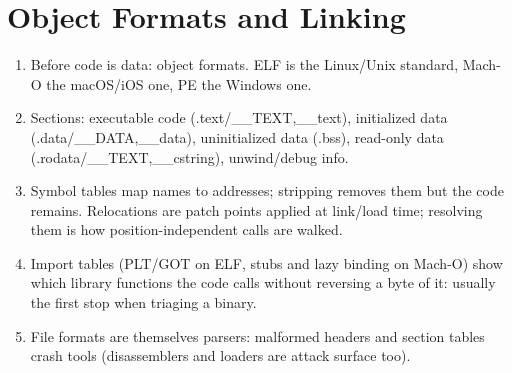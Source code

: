 \documentclass[12pt]{Training}
\begin{document}
\section*{Object Formats and Linking}
\begin{enumerate}
    \item Before code is data: object formats. ELF is the Linux/Unix standard, Mach-O the macOS/iOS one, PE the Windows one.
    \item Sections: executable code (.text/\_\_TEXT,\_\_text), initialized data (.data/\_\_DATA,\_\_data), uninitialized data (.bss), read-only data (.rodata/\_\_TEXT,\_\_cstring), unwind/debug info.
    \item Symbol tables map names to addresses; stripping removes them but the code remains. Relocations are patch points applied at link/load time; resolving them is how position-independent calls are walked.
    \item Import tables (PLT/GOT on ELF, stubs and lazy binding on Mach-O) show which library functions the code calls without reversing a byte of it: usually the first stop when triaging a binary.
    \item File formats are themselves parsers: malformed headers and section tables crash tools (disassemblers and loaders are attack surface too).
\end{enumerate}
\end{document}
